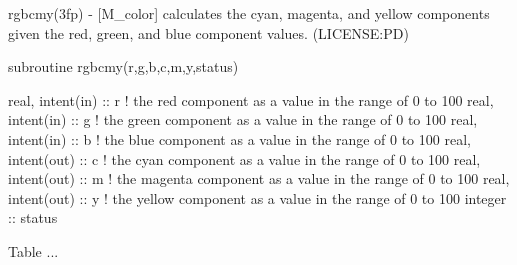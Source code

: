 \begin{DoxyDescription}
\item[\label{_RGBCMY}%
N\+A\+ME ]rgbcmy(3fp) -\/ \mbox{[}M\+\_\+color\mbox{]} calculates the cyan, magenta, and yellow components given the red, green, and blue component values. (L\+I\+C\+E\+N\+SE\+:PD) 


\item[S\+Y\+N\+O\+P\+S\+IS ]
\begin{DoxyPre}
    subroutine rgbcmy(r,g,b,c,m,y,status)\end{DoxyPre}



\begin{DoxyPre}     real, intent(in)  :: r ! the red component as a value in the range of 0 to 100
     real, intent(in)  :: g ! the green component as a value in the range of 0 to 100
     real, intent(in)  :: b ! the blue component as a value in the range of 0 to 100
     real, intent(out) :: c ! the cyan component as a value in the range of 0 to 100
     real, intent(out) :: m ! the magenta component as a value in the range of 0 to 100
     real, intent(out) :: y ! the yellow component as a value in the range of 0 to 100
     integer           :: status
    \end{DoxyPre}
 


\item[D\+E\+S\+C\+R\+I\+P\+T\+I\+ON ]Table ... ~\newline
~\newline


\begin{quote}
\tabulinesep=1mm
\end{quote}






\end{DoxyDescription}
